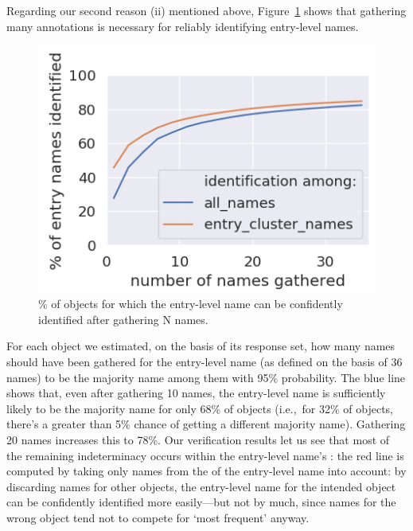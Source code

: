 Regarding our second reason (ii) mentioned above, Figure~\ref{fig:entry-level-name-stability} shows that gathering many annotations is necessary for reliably identifying entry-level names.
\begin{figure}[t]
	\centering
	\includegraphics[width=.7\columnwidth]{images/stability_analytic.png}
	\caption{\% of objects for which the entry-level name can be confidently identified after gathering N names.}
	\label{fig:entry-level-name-stability}
\end{figure}
For each object we estimated, on the basis of its \mn response set, how many names should have been gathered for the entry-level name (as defined on the basis of 36 names) to be the majority name among them with 95\% probability.
The blue line shows that, even after gathering 10 names, the entry-level name is sufficiently likely to be the majority name for only 68\% of objects (i.e.,~for 32\% of objects, there's a greater than 5\% chance of getting a different majority name).
Gathering 20 names increases this to 78\%.
Our verification results let us see that most of the remaining indeterminacy occurs within the entry-level name's \cluster:
the red line is computed by taking only names from the \cluster of the entry-level name into account:
by discarding names for other objects, the entry-level name for the intended object can be confidently identified more easily---but not by much, since names for the wrong object tend not to compete for `most frequent' anyway.

